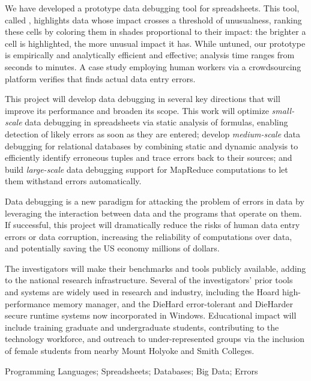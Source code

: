 We have developed a prototype data debugging tool
for spreadsheets. This tool, called
\checkcell{},
 highlights data whose impact crosses a threshold of unusualness,
ranking these cells by coloring them in shades proportional to their
impact: the brighter a cell is highlighted, the more unusual impact it
has.  While untuned, our prototype is empirically and analytically
efficient and effective; analysis time ranges from seconds to minutes.
A case study employing human workers via a crowdsourcing platform
verifies that \checkcell{} finds actual data entry errors.

This project will develop data debugging in several key directions that will improve its performance and broaden its scope. This work will
optimize \emph{small-scale} data debugging in spreadsheets via static
analysis of formulas, enabling detection of likely errors as soon as
they are entered; develop \emph{medium-scale} data debugging for
relational databases by combining static and dynamic analysis to
efficiently identify erroneous tuples and trace errors back to their
sources; and build \emph{large-scale} data debugging support for MapReduce
computations to let them withstand errors automatically.


\smallskip
{}
Data debugging is a new paradigm for attacking the problem of errors
in data by leveraging the interaction between data and the programs
that operate on them.  If successful, this project will dramatically
reduce the risks of human data entry errors or data corruption,
increasing the reliability of computations over data, and potentially
saving the US economy millions of dollars.

The investigators will make their benchmarks and tools publicly
available, adding to the national research infrastructure. Several of
the investigators' prior tools and systems are widely used in research
and industry, including the Hoard high-performance memory manager, and the
DieHard error-tolerant and DieHarder secure runtime systems now
incorporated in Windows. Educational impact will include training
graduate and undergraduate students, contributing to the technology
workforce, and outreach to under-represented groups via the inclusion
of female students from nearby Mount Holyoke and Smith Colleges.

\smallskip
{} Programming Languages; Spreadsheets; Databases; Big Data; Errors
